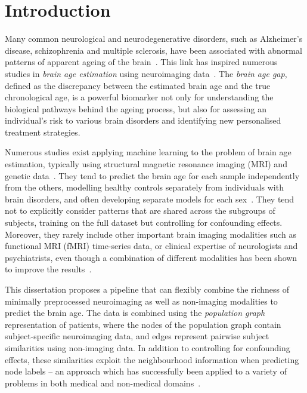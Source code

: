 \chapter{Introduction}



Many common neurological and neurodegenerative disorders, such as Alzheimer’s disease, schizophrenia and multiple sclerosis, have been associated with abnormal patterns of apparent ageing of the brain~\cite{kaufmann2019}. This link has inspired numerous studies in \textit{brain age estimation} using neuroimaging data~\cite{franke2019ten}. The \textit{brain age gap}, defined as the discrepancy between the estimated brain age and the true chronological age, is a powerful biomarker not only for understanding the biological pathways behind the ageing process, but also for assessing an individual’s risk to various brain disorders and identifying new personalised treatment strategies.


Numerous studies exist applying machine learning to the problem of brain age estimation, typically using structural magnetic resonance imaging (MRI) and genetic data~\cite{franke2019ten}. They tend to predict the brain age for each sample independently from the others, modelling healthy controls separately from individuals with brain disorders, and often developing separate models for each sex~\cite{kaufmann2019,niu2019improved}. They tend not to explicitly consider patterns that are shared across the subgroups of subjects, training on the full dataset but controlling for confounding effects. Moreover, they rarely include other important brain imaging modalities such as functional MRI (fMRI) time-series data, or clinical expertise of neurologists and psychiatrists, even though a combination of different modalities has been shown to improve the results~\cite{niu2019improved}. 


This dissertation proposes a pipeline that can flexibly combine the richness of minimally preprocessed neuroimaging as well as non-imaging modalities to predict the brain age. The data is combined using the \textit{population graph} representation of patients, where the nodes of the population graph contain subject-specific neuroimaging data, and edges represent pairwise subject similarities using non-imaging data. In addition to controlling for confounding effects, these similarities exploit the neighbourhood information when predicting node labels – an approach which has successfully been applied to a variety of problems in both medical and non-medical domains~\cite{parisot2018disease}. 


